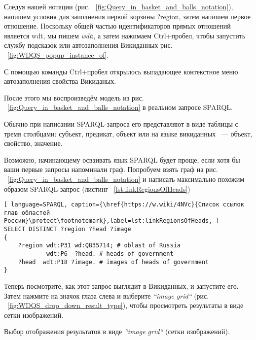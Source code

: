 Следуя нашей нотации (рис. ~\ref{fig:Query_in_basket_and_balls_notation}), напишем условия для заполнения первой корзины ?region, затем напишем первое отношение. Поскольку общей частью идентификаторов прямых отношений является wdt, мы пишем \textit{wdt}:, а затем нажимаем Ctrl+пробел, чтобы запустить службу подсказок или  автозаполнения Викиданных рис. ~\ref{fig:WDQS_popup_instance_of}.

\begin{marginfigure}[-2.5cm]
	{
		\setlength{\fboxsep}{0pt}%
		\setlength{\fboxrule}{1pt}%
	}
    \caption{С помощью команды Ctrl+пробел открылось выпадающее контекстное меню автозаполнения свойства Викиданых.}
	\label{fig:WDQS_popup_instance_of}
\end{marginfigure}

После этого мы воспроизведём модель из рис. ~\ref{fig:Query_in_basket_and_balls_notation} в реальном запросе SPARQL.

Обычно при написании SPARQL-запроса его представляют в виде таблицы с тремя столбцами: субъект, предикат, объект или на языке викиданных ~--- объект, свойство, значение.

Возможно, начинающему осваивать язык SPARQL будет проще, если хотя бы ваши первые запросы напоминали граф. Попробуем взять граф на рис. ~\ref{fig:Query_in_basket_and_balls_notation} и написать максимально похожим образом SPARQL-запрос (листинг ~\ref{lst:linkRegionsOfHeads})

\begin{lstlisting}[ language=SPARQL, caption={\href{https://w.wiki/4NVc}{Список ссылок глав областей России}\protect\footnotemark},label=lst:linkRegionsOfHeads, ]
SELECT DISTINCT ?region ?head ?image
{
    ?region wdt:P31 wd:Q835714; # oblast of Russia
            wdt:P6  ?head. # heads of government
    ?head  wdt:P18 ?image. # images of heads of government
}
\end{lstlisting}

\newpage Теперь посмотрите, как этот запрос выглядит в Викиданных, и запустите его. Затем нажмите на значок глаза слева и выберите \textit{``image grid``} (рис. ~\ref{fig:WDQS_drop_down_result_type}), чтобы просмотреть результаты в виде сетки изображений.

\begin{marginfigure}
	{
		\setlength{\fboxsep}{0pt}%
		\setlength{\fboxrule}{1pt}%
	}
    \caption{Выбор отображения результатов в виде \textit{``image grid``} (сетки изображений).}
	\label{fig:WDQS_drop_down_result_type}
\end{marginfigure}

